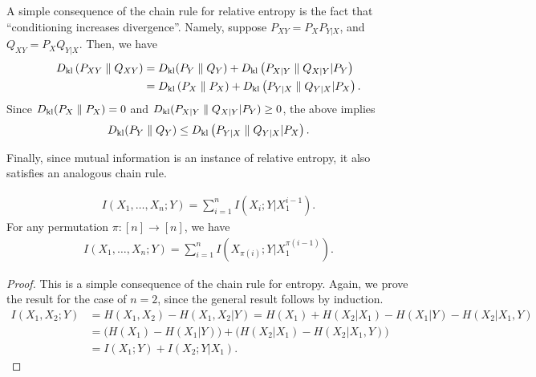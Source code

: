             \begin{corollary}
                A simple consequence of the chain rule for relative entropy is the fact that ``conditioning increases divergence''. Namely, suppose $P_{XY} = P_X P_{Y|X}$, and $Q_{XY} = P_X Q_{Y|X}$. Then, we have 
                \begin{align}
                    D_{\text{kl}}\left( P_{XY} \parallel Q_{XY} \right)    & = D_{\text{kl}}(P_Y \parallel Q_Y) + D_{\text{kl}}\left( P_{X|Y} \parallel Q_{X|Y} \vert P_Y \right) \\
                    & = D_{\text{kl}}\left( P_X \parallel P_X \right) + D_{\text{kl}}\left( P_{Y|X} \parallel Q_{Y|X} \vert P_X \right).  
                \end{align}
                Since $D_{\text{kl}}(P_X \parallel P_X)=0$ and $D_{\text{kl}}(P_{X|Y} \parallel Q_{X|Y} \vert P_Y) \geq 0$,  the above implies 
                \begin{align}
                       D_{\text{kl}}(P_Y \parallel Q_Y) \leq D_{\text{kl}}\left( P_{Y|X} \parallel Q_{Y|X} \vert P_X \right). 
                \end{align}
            \end{corollary}

            Finally, since mutual information is an instance of relative entropy, it also satisfies an analogous chain rule. 
            \begin{proposition}
                \label{prop:chain-rule-mi}
                \begin{align}
                    I(X_1, \ldots, X_n ; Y) = \sum_{i=1}^n I(X_i; Y|X_1^{i-1}). 
                \end{align}
                For any permutation $\pi:[n] \to [n]$, we have 
                \begin{align}
                    I(X_1, \ldots, X_n ; Y) = \sum_{i=1}^n I(X_{\pi(i)}; Y|X_1^{\pi(i-1)}). 
                \end{align}               
            \end{proposition}            
            \begin{proof}
                This is a simple consequence of the chain rule for entropy. Again, we prove the result for the case of $n=2$, since the general result follows by induction. 
                \begin{align}
                    I(X_1, X_2; Y) &= H(X_1, X_2) - H(X_1, X_2|Y) = H(X_1) + H(X_2|X_1) - H(X_1|Y) - H(X_2|X_1, Y) \\
                    & = \big( H(X_1) - H(X_1|Y) \big) + \big( H(X_2|X_1) - H(X_2|X_1, Y) \big) \\
                    & = I(X_1; Y) + I(X_2; Y|X_1). 
                \end{align}
            \end{proof}

